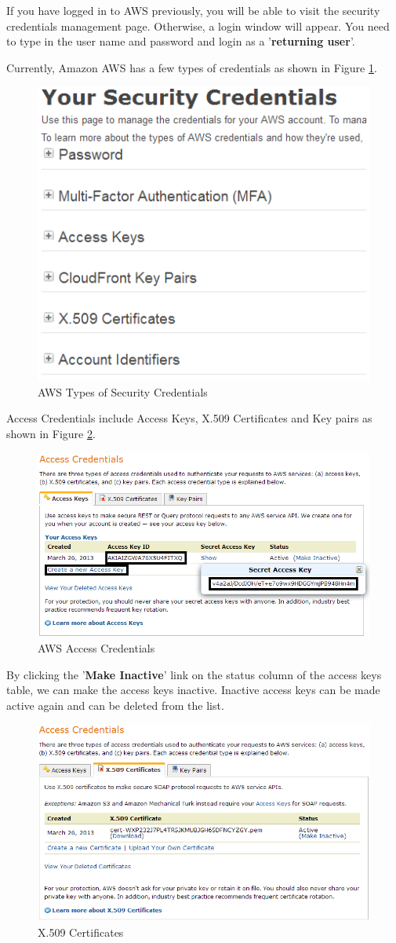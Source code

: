 If you have logged in to AWS previously, you will be able to visit the security credentials management page. Otherwise, a login window will appear. You need to type in the user name and password and login as a '\textbf{returning user}'.

Currently, Amazon AWS has a few types of credentials as shown in Figure \ref{fig:aws.credentials.types}.
\begin{figure}[ht]
  \centering
  \includegraphics[width=.50\textwidth]{figs/5163os_08_08.png}
  \caption{AWS Types of Security Credentials}\label{fig:aws.credentials.types}
\end{figure} 
Access Credentials include Access Keys, X.509 Certificates and Key pairs as shown in Figure \ref{fig:aws.access.credentials}.
\begin{figure}[ht]
  \centering
  \includegraphics[width=.8\textwidth]{figs/5163os_08_09.png}
  \caption{AWS Access Credentials}\label{fig:aws.access.credentials}
\end{figure} 
By clicking the '\textbf{Make Inactive}' link on the status column of the access keys table, we can make the access keys inactive. Inactive access keys can be made active again and can be deleted from the list.
\begin{figure}[ht]
  \centering
  \includegraphics[width=.8\textwidth]{figs/5163os_08_11.png}
  \caption{X.509 Certificates}\label{fig:aws.x509certificates}
\end{figure} 
